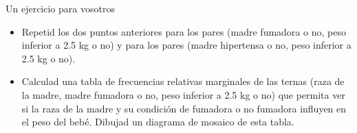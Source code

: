 \documentclass[
  ignorenonframetext,
  aspectratio=169]{beamer}
\begin{document}
\begin{frame}{Un ejercicio para vosotros}
\protect\hypertarget{un-ejercicio-para-vosotros-1}{}
\begin{itemize}
\item
  Repetid los dos puntos anteriores para los pares (madre fumadora o no,
  peso inferior a 2.5 kg o no) y para los pares (madre hipertensa o no,
  peso inferior a 2.5 kg o no).
\item
  Calculad una tabla de frecuencias relativas marginales de las ternas
  (raza de la madre, madre fumadora o no, peso inferior a 2.5 kg o no)
  que permita ver si la raza de la madre y su condición de fumadora o no
  fumadora influyen en el peso del bebé. Dibujad un diagrama de mosaico
  de esta tabla.
\end{itemize}
\end{frame}
\end{document}
